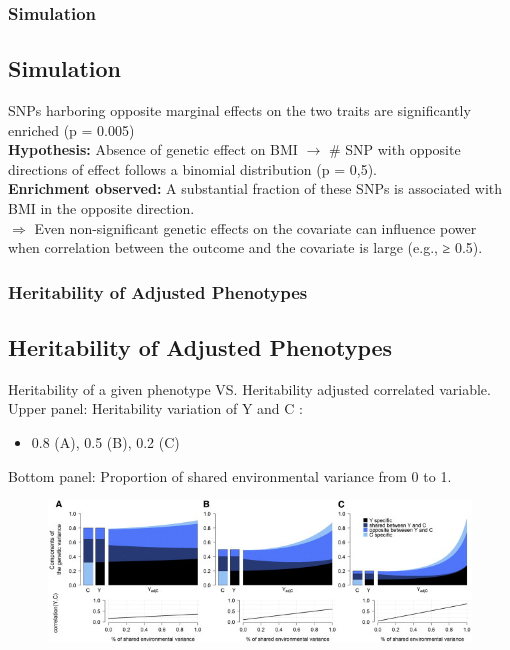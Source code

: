 \documentclass{beamer}
\begin{document}
\begin{frame}
\frametitle{Simulation}
\subsection{Simulation}
SNPs harboring opposite marginal effects on the two traits are significantly enriched (p = 0.005)\\\vspace{0.3cm}
\textbf{Hypothesis:} Absence of genetic effect on BMI $\rightarrow$ \# SNP with opposite directions of effect follows a binomial distribution (p = 0,5).\\\vspace{0.3cm}
\textbf{Enrichment observed:} A substantial fraction of these SNPs is associated with BMI in the opposite direction.\\\vspace{0.3cm}
$\Rightarrow$ Even non-significant genetic effects on the covariate can influence power when correlation between the outcome and the covariate is large (e.g., ≥ 0.5).
\end{frame}
\begin{frame}
\frametitle{Heritability of Adjusted Phenotypes}
\subsection{Heritability of Adjusted Phenotypes}
Heritability of a given phenotype VS. Heritability adjusted correlated variable. \\
Upper panel: Heritability variation of Y and C :
\begin{itemize}
\item 0.8 (A), 0.5 (B), 0.2 (C)
\end{itemize}
Bottom panel: Proportion of shared environmental variance from 0 to 1.
\begin{figure}
\includegraphics[width=1\linewidth]{fig_3}
\end{figure}

\end{frame}
\end{document}
